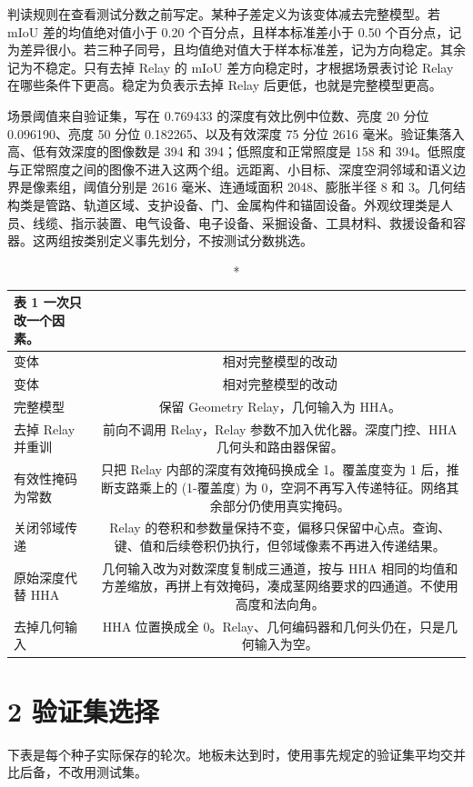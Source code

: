\documentclass[11pt]{article}
\begin{document}
判读规则在查看测试分数之前写定。某种子差定义为该变体减去完整模型。若 mIoU 差的均值绝对值小于 0.20 个百分点，且样本标准差小于 0.50 个百分点，记为差异很小。若三种子同号，且均值绝对值大于样本标准差，记为方向稳定。其余记为不稳定。只有去掉 Relay 的 mIoU 差方向稳定时，才根据场景表讨论 Relay 在哪些条件下更高。稳定为负表示去掉 Relay 后更低，也就是完整模型更高。

场景阈值来自验证集，写在 0.769433 的深度有效比例中位数、亮度 20 分位 0.096190、亮度 50 分位 0.182265、以及有效深度 75 分位 2616 毫米。验证集落入高、低有效深度的图像数是 394 和 394；低照度和正常照度是 158 和 394。低照度与正常照度之间的图像不进入这两个组。远距离、小目标、深度空洞邻域和语义边界是像素组，阈值分别是 2616 毫米、连通域面积 2048、膨胀半径 8 和 3。几何结构类是管路、轨道区域、支护设备、门、金属构件和锚固设备。外观纹理类是人员、线缆、指示装置、电气设备、电子设备、采掘设备、工具材料、救援设备和容器。这两组按类别定义事先划分，不按测试分数挑选。

{\footnotesize\setlength{\tabcolsep}{3pt}
\begin{longtable}{lc}
\caption*{表 1  一次只改一个因素。}\\
\toprule
变体 & 相对完整模型的改动\\
\midrule
\endfirsthead
\toprule
变体 & 相对完整模型的改动\\
\midrule
\endhead
完整模型 & 保留 Geometry Relay，几何输入为 HHA。\\
去掉 Relay 并重训 & 前向不调用 Relay，Relay 参数不加入优化器。深度门控、HHA 几何头和路由器保留。\\
有效性掩码为常数 & 只把 Relay 内部的深度有效掩码换成全 1。覆盖度变为 1 后，推断支路乘上的 (1-覆盖度) 为 0，空洞不再写入传递特征。网络其余部分仍使用真实掩码。\\
关闭邻域传递 & Relay 的卷积和参数量保持不变，偏移只保留中心点。查询、键、值和后续卷积仍执行，但邻域像素不再进入传递结果。\\
原始深度代替 HHA & 几何输入改为对数深度复制成三通道，按与 HHA 相同的均值和方差缩放，再拼上有效掩码，凑成茎网络要求的四通道。不使用高度和法向角。\\
去掉几何输入 & HHA 位置换成全 0。Relay、几何编码器和几何头仍在，只是几何输入为空。\\
\bottomrule
\end{longtable}}
\section*{2  验证集选择}
下表是每个种子实际保存的轮次。地板未达到时，使用事先规定的验证集平均交并比后备，不改用测试集。
\end{document}
